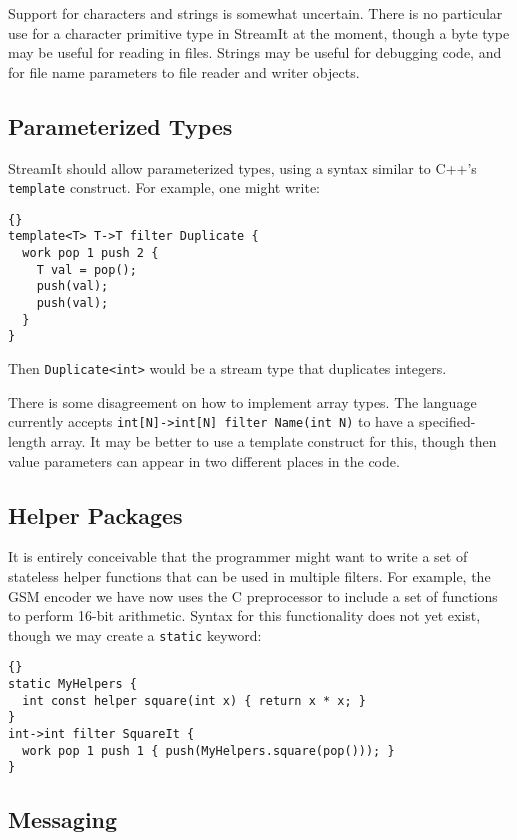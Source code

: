 \documentclass[11pt]{article}
\begin{document}
Support for characters and strings is somewhat uncertain.  There is no
particular use for a character primitive type in StreamIt at the
moment, though a byte type may be useful for reading in files.
Strings may be useful for debugging code, and for file name parameters
to file reader and writer objects.

\subsection{Parameterized Types}

StreamIt should allow parameterized types, using a syntax similar to
C++'s \lstinline|template| construct.  For example, one might write:

\begin{lstlisting}{}
template<T> T->T filter Duplicate {
  work pop 1 push 2 {
    T val = pop();
    push(val);
    push(val);
  }
}
\end{lstlisting}

Then \lstinline|Duplicate<int>| would be a stream type that duplicates
integers.

There is some disagreement on how to implement array types.  The
language currently accepts \lstinline|int[N]->int[N] filter Name(int N)| to
have a specified-length array.  It may be better to use a template
construct for this, though then value parameters can appear in two
different places in the code.

\subsection{Helper Packages}

It is entirely conceivable that the programmer might want to write a
set of stateless helper functions that can be used in multiple
filters.  For example, the GSM encoder we have now uses the C
preprocessor to include a set of functions to perform 16-bit
arithmetic.  Syntax for this functionality does not yet exist, though
we may create a \lstinline|static| keyword:

\begin{lstlisting}{}
static MyHelpers {
  int const helper square(int x) { return x * x; }
}
int->int filter SquareIt {
  work pop 1 push 1 { push(MyHelpers.square(pop())); }
}
\end{lstlisting}

\subsection{Messaging}
\end{document}
